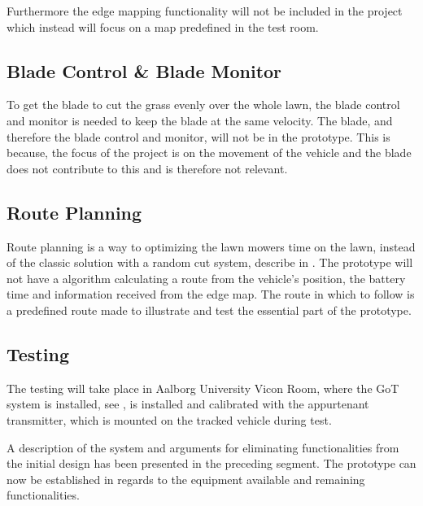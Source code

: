Furthermore the edge mapping functionality will not be included in the project which instead will focus on a map predefined in the test room.


\subsection{Blade Control \& Blade Monitor}
To get the blade to cut the grass evenly over the whole lawn, the blade control and monitor is needed to keep the blade at the same velocity.
The blade, and therefore the blade control and monitor, will not be in the prototype. This is because, the focus of the project is on the movement of the vehicle and the blade does not contribute to this and is therefore not relevant.

\subsection{Route Planning}
Route planning is a way to optimizing the lawn mowers time on the lawn, instead of the classic solution with a random cut system, describe in . The prototype will not have a algorithm calculating a route from the vehicle's position, the battery time and information received from the edge map. The route in which to follow is a predefined route made to illustrate and test the essential part of the prototype.

\subsection{Testing}
The testing will take place in Aalborg University Vicon Room, where the GoT system is installed, see , is installed and calibrated with the appurtenant transmitter, which is mounted on the tracked vehicle during test.

A description of the system and arguments for eliminating functionalities from the initial design has been presented in the preceding segment. The prototype can now be established in regards to the equipment available and remaining functionalities.
